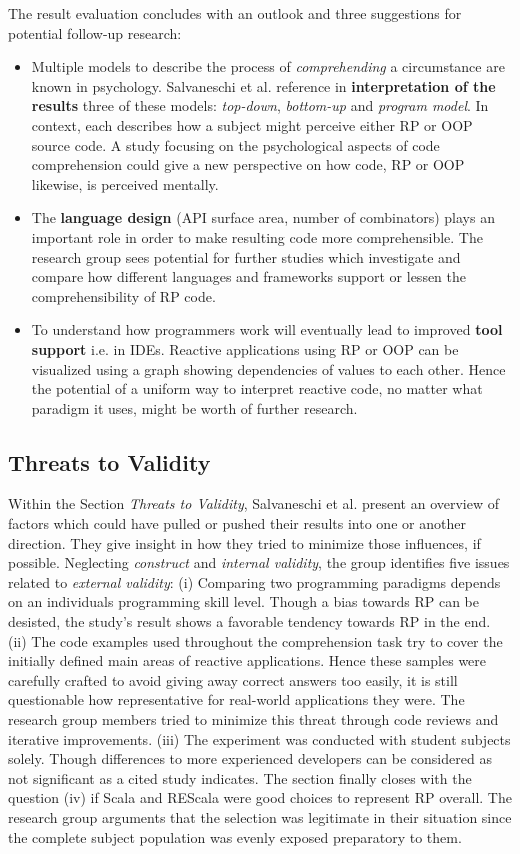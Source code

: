 \documentclass[12pt,a4paper]{article}
\begin{document}
The result evaluation concludes with an outlook and three suggestions for potential follow-up research:

\begin{itemize}
	\item Multiple models to describe the process of \emph{comprehending} a circumstance are known in psychology. Salvaneschi et al. \cite{7827078} reference in \textbf{interpretation of the results} three of these models: \emph{top-down}, \emph{bottom-up} and \emph{program model}. In context, each describes how a subject might perceive either RP or OOP source code. A study focusing on the psychological aspects of code comprehension could give a new perspective on how code, RP or OOP likewise, is perceived mentally.
	\item The \textbf{language design} (API surface area, number of combinators) plays an important role in order to make resulting code more comprehensible. The research group sees potential for further studies which investigate and compare how different languages and frameworks support or lessen the comprehensibility of RP code.
	\item To understand how programmers work will eventually lead to improved \textbf{tool support} i.e. in IDEs. Reactive applications using RP or OOP can be visualized using a graph showing dependencies of values to each other. Hence the potential of a uniform way to interpret reactive code, no matter what paradigm it uses, might be worth of further research.
\end{itemize}

\subsection{Threats to Validity}

Within the Section \emph{Threats to Validity}, Salvaneschi et al. \cite{7827078} present an overview of factors which could have pulled or pushed their results into one or another direction. They give insight in how they tried to minimize those influences, if possible. Neglecting \emph{construct} and \emph{internal validity}, the group identifies five issues related to \emph{external validity}: (i) Comparing two programming paradigms depends on an individuals programming skill level. Though a bias towards RP can be desisted, the study's result shows a favorable tendency towards RP in the end. (ii) The code examples used throughout the comprehension task try to cover the initially defined main areas of reactive applications. Hence these samples were carefully crafted to avoid giving away correct answers too easily, it is still questionable how representative for real-world applications they were. The research group members tried to minimize this threat through code reviews and iterative improvements. (iii) The experiment was conducted with student subjects solely. Though differences to more experienced developers can be considered as not significant as a cited study \cite{DiPenta} indicates. The section finally closes with the question (iv) if Scala and REScala were good choices to represent RP overall. The research group arguments that the selection was legitimate in their situation since the complete subject population was evenly exposed preparatory to them.
\end{document}
